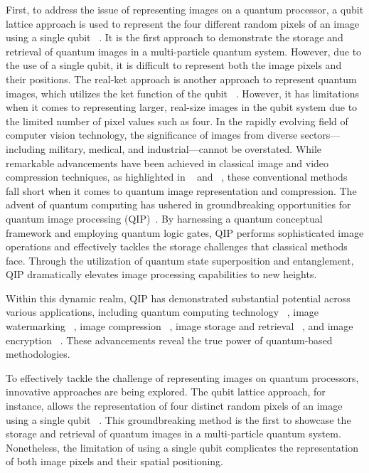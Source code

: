 First, to address the issue of representing images on a quantum processor, a qubit lattice approach is used to represent the four different random pixels of an image using a single qubit ~\cite{b10}. It is the first approach to demonstrate the storage and retrieval of quantum images in a multi-particle quantum system. However, due to the use of a single qubit, it is difficult to represent both the image pixels and their positions. The real-ket approach is another approach to represent quantum images, which utilizes the ket function of the qubit ~\cite{b12}. However, it has limitations when it comes to representing larger, real-size images in the qubit system due to the limited number of pixel values such as four. In the rapidly evolving field of computer vision technology, the significance of images from diverse sectors—including military, medical, and industrial—cannot be overstated. While remarkable advancements have been achieved in classical image and video compression techniques, as highlighted in ~\cite{paul2005real} and ~\cite{paul2018efficient}, these conventional methods fall short when it comes to quantum image representation and compression. The advent of quantum computing has ushered in groundbreaking opportunities for quantum image processing (QIP)~\cite{b11}. By harnessing a quantum conceptual framework and employing quantum logic gates, QIP performs sophisticated image operations and effectively tackles the storage challenges that classical methods face. Through the utilization of quantum state superposition and entanglement, QIP dramatically elevates image processing capabilities to new heights.

Within this dynamic realm, QIP has demonstrated substantial potential across various applications, including quantum computing technology ~\cite{yan2017quantum}, image watermarking ~\cite{song2014dynamic, song2013dynamic,iliyasu2012watermarking, hu2019quantum, kong2010color}, image compression ~\cite{b13, pm}, image storage and retrieval ~\cite{li2014multi}, and image encryption ~\cite{wang2022efficient, wang2014novel}. These advancements reveal the true power of quantum-based methodologies.

To effectively tackle the challenge of representing images on quantum processors, innovative approaches are being explored. The qubit lattice approach, for instance, allows the representation of four distinct random pixels of an image using a single qubit ~\cite{b10}. This groundbreaking method is the first to showcase the storage and retrieval of quantum images in a multi-particle quantum system. Nonetheless, the limitation of using a single qubit complicates the representation of both image pixels and their spatial positioning.

